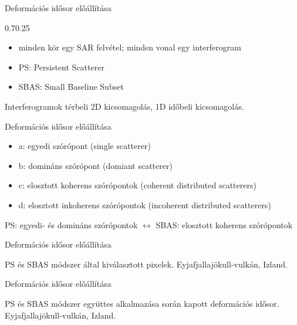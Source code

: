 \def\ft{Deformációs idősor előállítása}


\begin{frame}{\ft}
    \begin{figp}{}{}{0.7}{0.25}
        \begin{itemize}
            \item minden kör egy SAR felvétel; minden vonal egy interferogram
            \item PS: Persistent Scatterer
            \item SBAS: Small Baseline Subset
        \end{itemize}
    \end{figp}
    \vspace{25pt}
    \centering
    
    Interferogramok térbeli 2D kicsomagolás, 1D időbeli kicsomagolás.
\end{frame}


\begin{frame}{\ft}
    \begin{minic}{0.8}
    \end{minic}
    \centering
    \begin{itemize}
        \item a: egyedi szórópont (single scatterer)
        \item b: domináns szórópont (domiant scatterer)
        \item c: elosztott koherens szórópontok (coherent distributed scatterers)
        \item d: elosztott inkoherens szórópontok (incoherent distributed scatterers)
    \end{itemize}
    PS: egyedi- és domináns szórópontok $\leftrightarrow$ SBAS: elosztott koherens szórópontok
\end{frame}


\begin{frame}{\ft}
    \begin{minic}{1.0}
    \end{minic}
    \centering
    
    PS és SBAS módszer által kiválasztott pixelek. Eyjafjallajökull-vulkán, Izland.
\end{frame}

\begin{frame}{\ft}
    \begin{minic}{0.6}
    \end{minic}
    \centering
    
    PS és SBAS módszer együttes alkalmazása során kapott deformációs idősor. Eyjafjallajökull-vulkán, Izland.
\end{frame}


